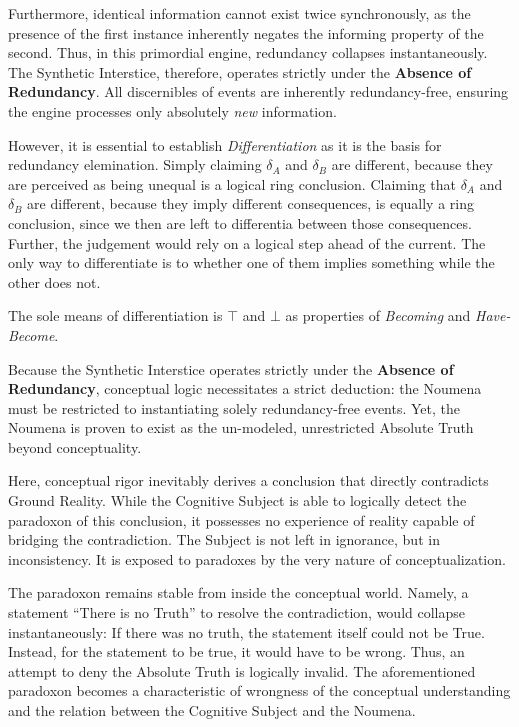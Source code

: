 \documentclass[11pt, a4paper]{article}
\theoremstyle{formalism}
\begin{document}
Furthermore, identical information cannot exist twice synchronously, as the 
presence of the first instance inherently negates the informing property of 
the second. Thus, in this primordial engine, redundancy collapses instantaneously. 
The Synthetic Interstice, therefore, operates strictly under the \textbf{Absence 
of Redundancy}. All discernibles of events are inherently redundancy-free, 
ensuring the engine processes only absolutely \textit{new} information.

However, it is essential to establish
\textit{Differentiation} as it is the basis for redundancy elemination. Simply
claiming $\delta_A$ and $\delta_B$ are different, because they are perceived as
being unequal is a logical ring conclusion. 
Claiming that $\delta_A$ and $\delta_B$ are different, because they imply 
different consequences, is equally a ring conclusion, since we then are left
to differentia between those consequences. Further, the judgement would rely on
a logical step ahead of the current. The only way to differentiate is to whether
one of them implies something while the other does not. 

The sole means of differentiation is
$\top$ and $\bot$ as properties of \textit{Becoming} and \textit{Have-Become}.

Because the Synthetic Interstice operates strictly under the \textbf{Absence of
Redundancy}, conceptual logic necessitates a strict deduction: the Noumena must
be restricted to instantiating solely redundancy-free events. Yet, the Noumena
is proven to exist as the un-modeled, unrestricted Absolute Truth beyond
conceptuality. 

Here, conceptual rigor inevitably derives a conclusion that directly
contradicts Ground Reality. While the Cognitive Subject is able to logically
detect the paradoxon of this conclusion, it possesses no experience of reality
capable of bridging the contradiction. The Subject is not left in ignorance,
but in inconsistency. It is exposed to paradoxes by the very nature of
conceptualization. 

The paradoxon remains stable from inside the conceptual world. Namely, a
statement ``There is no Truth'' to resolve the contradiction, would collapse
instantaneously: If there was no truth, the statement itself could not be True.
Instead, for the statement to be true, it would have to be wrong. Thus, an
attempt to deny the Absolute Truth is logically invalid. The aforementioned
paradoxon becomes a characteristic of wrongness of the conceptual understanding
and the relation between the Cognitive Subject and the Noumena.
\end{document}
